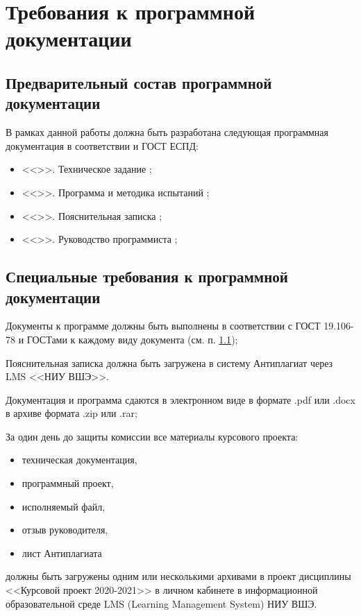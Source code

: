 \documentclass[a4paper,12pt]{article}
\begin{document}
  \newpage
  \section{Требования к программной документации}
  \subsection{Предварительный состав программной документации}
  \label{sec:doclist}
  В рамках данной работы должна быть разработана следующая программная документация в соответствии и ГОСТ ЕСПД:
  \begin{itemize}
    \item <<\CRTname>>. Техническое задание \cite{gostTZ};
    \item <<\CRTname>>. Программа и методика испытаний \cite{gostPMI};
    \item <<\CRTname>>. Пояснительная записка \cite{gostPZ};
    \item <<\CRTname>>. Руководство программиста \cite{gostRP};
  \end{itemize}

  \subsection{Специальные требования к программной документации}
  Документы к программе должны быть выполнены в соответствии с ГОСТ 19.106-78 и ГОСТами к каждому виду документа
  (см. п. \ref{sec:doclist});

  Пояснительная записка должна быть загружена в систему Антиплагиат через LMS <<НИУ ВШЭ>>.

  Документация и программа сдаются в электронном виде в формате .pdf или .docx в архиве формата .zip или .rar;

  За один день до защиты комиссии все материалы курсового проекта:
  \begin{itemize}
    \item техническая документация,
    \item программный проект,
    \item исполняемый файл,
    \item отзыв руководителя,
    \item лист Антиплагиата
  \end{itemize}
  должны быть загружены одним или несколькими архивами в проект дисциплины <<Курсовой проект 2020-2021>> в личном кабинете в информационной образовательной среде LMS (Learning Management System) НИУ ВШЭ.
\end{document}
